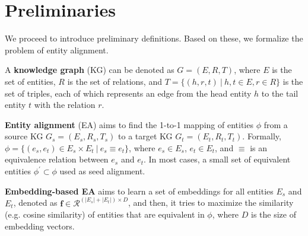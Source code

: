 

\section{Preliminaries}
\label{sec:define}
We proceed to introduce preliminary definitions. Based on these, we formalize the problem of entity alignment.

\vspace{-2mm}
\begin{myDef}
A \textbf{knowledge graph} (KG) can be denoted as $G = (E,R,T)$, where $E$ is the set of entities, $R$ is the set of relations, and $T=\{(h,r,t)~|~h,t \in E, r \in R\}$ is the set of triples, each of which represents an edge from the head entity $h$ to the tail entity $t$ with the relation $r$.
\end{myDef}

\vspace{-3mm}
\begin{myDef}
\label{sec:problem_statement}
\textbf{Entity alignment} (EA) \cite{OpenEA2020VLDB} aims to find the 1-to-1 mapping of entities $\phi$ from a source KG $G_s = (E_s,R_s,T_s)$ to a target KG $G_t = (E_t,R_t,T_t)$.
Formally, $\phi = \{(e_s, e_t) \in E_s \times E_t~|~e_s \equiv e_t\}$, where
$e_s \in E_s$, $e_t \in E_t$, and $\equiv$ is an equivalence relation between $e_s$ and $e_t$.
In most cases, a small set of equivalent entities $\phi^{\prime} \subset \phi$  used as seed alignment.
\end{myDef}

\vspace{-2mm}
\begin{myDef}
\textbf{Embedding-based EA} aims to learn a set of embeddings for all entities $E_s$ and $E_t$, denoted as $\mathbf{f}\in \mathcal{R}^{(|E_s|+|E_t|)\times D}$, and then, it tries to maximize the similarity (e.g. cosine similarity) of entities that are equivalent in $\phi$, where $D$ is the size of embedding vectors.
\end{myDef} 